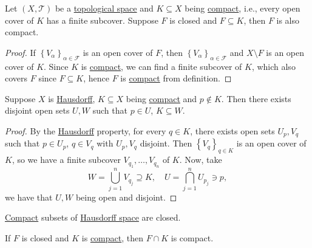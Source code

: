 \begin{theorem}
	Let \((X, \mathcal{T})\) be a \hyperref[def:topological-space]{topological space} and \(K \subseteq X\) being \hyperref[def:compact]{compact}, i.e., every open cover of \(K\) has a finite subcover. Suppose \(F\) is closed and \(F \subseteq K\), then \(F\) is also compact.
\end{theorem}
\begin{proof}
	If \(\left\{ V_\alpha \right\}_{\alpha \in \mathcal{F} } \) is an open cover of \(F\), then \(\left\{ V_\alpha  \right\}_{\alpha \in \mathcal{F} } \) and \(X\setminus F\) is an open cover of \(K\). Since \(K\) is \hyperref[def:compact]{compact}, we can find a finite subcover of \(K\), which also covers \(F\) since \(F \subseteq K\), hence \(F\) is \hyperref[def:compact]{compact} from definition.
\end{proof}

\begin{theorem}
	Suppose \(X\) is \hyperref[def:Hausdorff]{Hausdorff}, \(K \subseteq X\) being \hyperref[def:compact]{compact} and \(p \notin K\). Then there exists disjoint open sets \(U, W\) such that \(p\in U\), \(K \subseteq W\).
\end{theorem}
\begin{proof}
	By the \hyperref[def:Hausdorff]{Hausdorff} property, for every \(q\in K\), there exists open sets \(U_p, V_q\) such that \(p\in U_p\), \(q\in V_q\) with \(U_p, V_q\) disjoint. Then \(\left\{ V_q \right\} _{q\in K}\) is an open cover of \(K\), so we have a finite subcover \(V_{q_1}, \ldots  , V_{q_n}\) of \(K\). Now, take
	\[
		W = \bigcup_{j=1}^{n} V_{q_j} \supseteq K,\quad
		U = \bigcap_{j=1}^{n} U_{p_j} \ni p,
	\]
	we have that \(U, W\) being open and disjoint.
\end{proof}

\begin{corollary}\label{col:compact-set-of-Hausdorff-closed}
	\hyperref[def:compact]{Compact} subsets of \hyperref[def:Hausdorff]{Hausdorff space} are closed.
\end{corollary}

\begin{corollary}\label{col:closed-subset-of-compact-set-is-compact}
	If \(F\) is closed and \(K\) is \hyperref[def:compact]{compact}, then \(F \cap K\) is compact.
\end{corollary}

